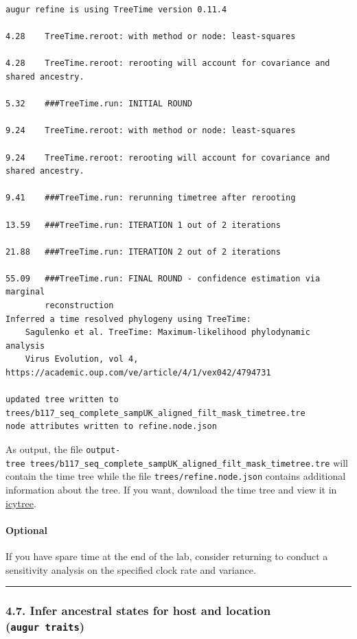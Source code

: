 \documentclass[
]{book}
\begin{document}
\begin{verbatim}
augur refine is using TreeTime version 0.11.4

4.28    TreeTime.reroot: with method or node: least-squares

4.28    TreeTime.reroot: rerooting will account for covariance and shared ancestry.

5.32    ###TreeTime.run: INITIAL ROUND

9.24    TreeTime.reroot: with method or node: least-squares

9.24    TreeTime.reroot: rerooting will account for covariance and shared ancestry.

9.41    ###TreeTime.run: rerunning timetree after rerooting

13.59   ###TreeTime.run: ITERATION 1 out of 2 iterations

21.88   ###TreeTime.run: ITERATION 2 out of 2 iterations

55.09   ###TreeTime.run: FINAL ROUND - confidence estimation via marginal
        reconstruction
Inferred a time resolved phylogeny using TreeTime:
    Sagulenko et al. TreeTime: Maximum-likelihood phylodynamic analysis
    Virus Evolution, vol 4, https://academic.oup.com/ve/article/4/1/vex042/4794731

updated tree written to trees/b117_seq_complete_sampUK_aligned_filt_mask_timetree.tre
node attributes written to refine.node.json
\end{verbatim}

As output, the file \texttt{output-tree\ trees/b117\_seq\_complete\_sampUK\_aligned\_filt\_mask\_timetree.tre} will contain the time tree while the file \texttt{trees/refine.node.json} contains additional information about the tree. If you want, download the time tree and view it in \href{https://icytree.org/}{icytree}.

\paragraph{Optional}\label{optional-1}

If you have spare time at the end of the lab, consider returning to conduct a sensitivity analysis on the specified clock rate and variance.

\begin{center}\rule{0.5\linewidth}{0.5pt}\end{center}

\subsubsection{\texorpdfstring{4.7. Infer ancestral states for host and location (\texttt{augur\ traits})}{4.7. Infer ancestral states for host and location (augur traits)}}\label{infer-ancestral-states-for-host-and-location-augur-traits}
\end{document}
